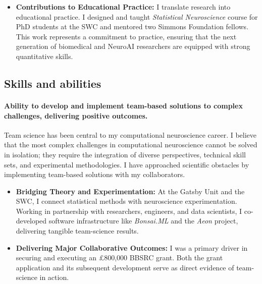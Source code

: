 \documentclass{article}
\begin{document}
\begin{itemize}
\begin{itemize}
        \item
            \href{https://github.com/joacorapela/bayesianLinearRegression}{\textit{joacorapela/bayesianLinearRegression}}
            \&
            \href{https://github.com/joacorapela/variationalLinearRegression}{\textit{joacorapela/variationalLinearRegression}}:
            Python code for exact and variational Bayesian inference.

    \end{itemize}

    \item \textbf{Contributions to Educational Practice:} I translate
        research into educational practice. I designed and taught
        \textit{Statistical Neuroscience} course for PhD students at the
        SWC and mentored two Simmons Foundation fellows.
        This work represents a commitment to practice, ensuring that the next
        generation of biomedical and NeuroAI researchers are equipped with
        strong quantitative skills.

\end{itemize}

\subsection*{Skills and abilities}

\paragraph{Ability to develop and implement team-based solutions to complex challenges,
delivering positive outcomes.}

Team science has been central to my computational neuroscience career.  I
believe that the most complex challenges in computational neuroscience cannot
be solved in isolation; they require the integration of diverse perspectives,
technical skill sets, and experimental methodologies. I have approached
scientific obstacles by implementing team-based solutions with my
collaborators.

\begin{itemize}

    \item \textbf{Bridging Theory and Experimentation:} At the Gatsby Unit and
        the SWC, I connect statistical methods with neuroscience
        experimentation.  Working in partnership with researchers, engineers,
        and data scientists, I co-developed software infrastructure like
        \textit{Bonsai.ML} and the \textit{Aeon} project, delivering tangible
        team-science results.

    \item \textbf{Delivering Major Collaborative Outcomes:} I was a primary
        driver in securing and executing an £800,000 BBSRC grant. Both the
        grant application and its subsequent development serve as direct
        evidence of team-science in action.

\end{itemize}
\end{document}
